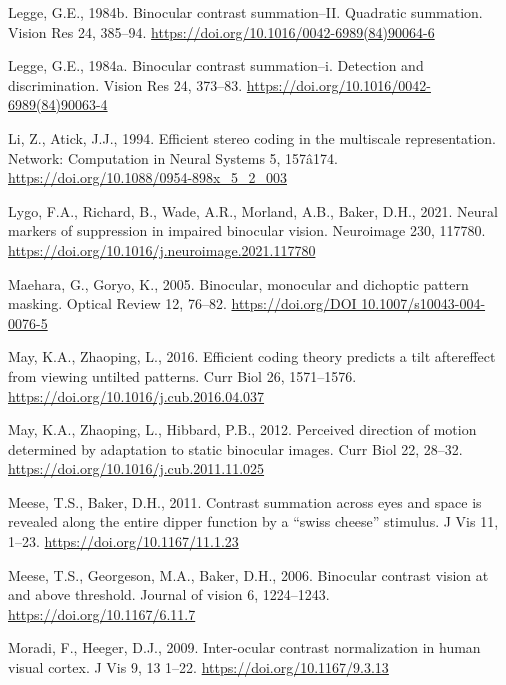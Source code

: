 \documentclass[review,
  12pt,
]{elsarticle}
\newlength{\cslhangindent}
\newenvironment{CSLReferences}[2] %
 {\begin{list}{}{%
  \setlength{\itemindent}{0pt}
  \setlength{\leftmargin}{0pt}
  \setlength{\parsep}{0pt}
  \ifodd #1
   \setlength{\leftmargin}{\cslhangindent}
   \setlength{\itemindent}{-1\cslhangindent}
  \fi
  \setlength{\itemsep}{#2\baselineskip}}}
 {\end{list}}
\begin{document}
\begin{CSLReferences}{1}{0}
Legge, G.E., 1984b. Binocular contrast summation--II. Quadratic
summation. Vision Res 24, 385--94.
\url{https://doi.org/10.1016/0042-6989(84)90064-6}

Legge, G.E., 1984a. Binocular contrast summation--i. Detection and
discrimination. Vision Res 24, 373--83.
\url{https://doi.org/10.1016/0042-6989(84)90063-4}

Li, Z., Atick, J.J., 1994. Efficient stereo coding in the multiscale
representation. Network: Computation in Neural Systems 5, 157â174.
\url{https://doi.org/10.1088/0954-898x_5_2_003}

Lygo, F.A., Richard, B., Wade, A.R., Morland, A.B., Baker, D.H., 2021.
Neural markers of suppression in impaired binocular vision. Neuroimage
230, 117780. \url{https://doi.org/10.1016/j.neuroimage.2021.117780}

Maehara, G., Goryo, K., 2005. Binocular, monocular and dichoptic pattern
masking. Optical Review 12, 76--82.
\href{https://doi.org/DOI\%2010.1007/s10043-004-0076-5}{https://doi.org/DOI
10.1007/s10043-004-0076-5}

May, K.A., Zhaoping, L., 2016. Efficient coding theory predicts a tilt
aftereffect from viewing untilted patterns. Curr Biol 26, 1571--1576.
\url{https://doi.org/10.1016/j.cub.2016.04.037}

May, K.A., Zhaoping, L., Hibbard, P.B., 2012. Perceived direction of
motion determined by adaptation to static binocular images. Curr Biol
22, 28--32. \url{https://doi.org/10.1016/j.cub.2011.11.025}

Meese, T.S., Baker, D.H., 2011. Contrast summation across eyes and space
is revealed along the entire dipper function by a {``swiss cheese''}
stimulus. J Vis 11, 1--23. \url{https://doi.org/10.1167/11.1.23}

Meese, T.S., Georgeson, M.A., Baker, D.H., 2006. Binocular contrast
vision at and above threshold. Journal of vision 6, 1224--1243.
\url{https://doi.org/10.1167/6.11.7}

Moradi, F., Heeger, D.J., 2009. Inter-ocular contrast normalization in
human visual cortex. J Vis 9, 13 1--22.
\url{https://doi.org/10.1167/9.3.13}


\end{CSLReferences}
\end{document}
